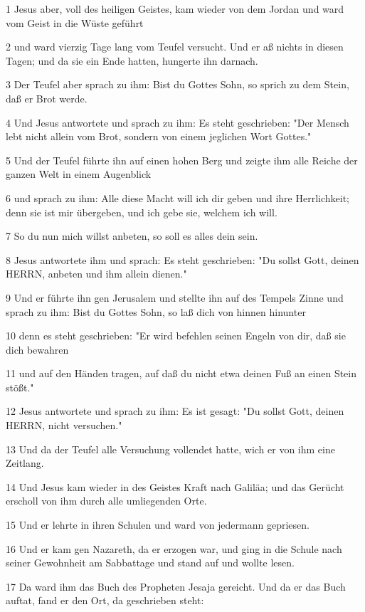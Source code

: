 \par 1 Jesus aber, voll des heiligen Geistes, kam wieder von dem Jordan und ward vom Geist in die Wüste geführt
\par 2 und ward vierzig Tage lang vom Teufel versucht. Und er aß nichts in diesen Tagen; und da sie ein Ende hatten, hungerte ihn darnach.
\par 3 Der Teufel aber sprach zu ihm: Bist du Gottes Sohn, so sprich zu dem Stein, daß er Brot werde.
\par 4 Und Jesus antwortete und sprach zu ihm: Es steht geschrieben: "Der Mensch lebt nicht allein vom Brot, sondern von einem jeglichen Wort Gottes."
\par 5 Und der Teufel führte ihn auf einen hohen Berg und zeigte ihm alle Reiche der ganzen Welt in einem Augenblick
\par 6 und sprach zu ihm: Alle diese Macht will ich dir geben und ihre Herrlichkeit; denn sie ist mir übergeben, und ich gebe sie, welchem ich will.
\par 7 So du nun mich willst anbeten, so soll es alles dein sein.
\par 8 Jesus antwortete ihm und sprach: Es steht geschrieben: "Du sollst Gott, deinen HERRN, anbeten und ihm allein dienen."
\par 9 Und er führte ihn gen Jerusalem und stellte ihn auf des Tempels Zinne und sprach zu ihm: Bist du Gottes Sohn, so laß dich von hinnen hinunter
\par 10 denn es steht geschrieben: "Er wird befehlen seinen Engeln von dir, daß sie dich bewahren
\par 11 und auf den Händen tragen, auf daß du nicht etwa deinen Fuß an einen Stein stößt."
\par 12 Jesus antwortete und sprach zu ihm: Es ist gesagt: "Du sollst Gott, deinen HERRN, nicht versuchen."
\par 13 Und da der Teufel alle Versuchung vollendet hatte, wich er von ihm eine Zeitlang.
\par 14 Und Jesus kam wieder in des Geistes Kraft nach Galiläa; und das Gerücht erscholl von ihm durch alle umliegenden Orte.
\par 15 Und er lehrte in ihren Schulen und ward von jedermann gepriesen.
\par 16 Und er kam gen Nazareth, da er erzogen war, und ging in die Schule nach seiner Gewohnheit am Sabbattage und stand auf und wollte lesen.
\par 17 Da ward ihm das Buch des Propheten Jesaja gereicht. Und da er das Buch auftat, fand er den Ort, da geschrieben steht:

